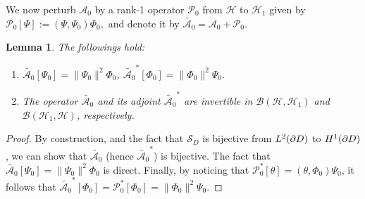 \documentclass[11pt]{article}
\numberwithin{equation}{section}
\newtheorem{lem}{Lemma}[section]
\def\cA{{\mathcal{A}}}
\newcommand\1{{\ensuremath {\mathds 1} }}
\begin{document}
We now perturb  $ \mathcal{A}_0 $ by a rank-1 operator $\mathcal{P}_0$ from $\mathcal{H}$ to $\mathcal{H}_1$
given by 
$
\mathcal{P}_0[\Psi]:= (\Psi, \Psi_0)\Phi_0,
$
and denote it by
$
\tilde{\mathcal{A}_0}= \mathcal{A}_0 + \mathcal{P}_0
$.
\begin{lem} The followings hold:
\begin{enumerate}
\item[(i)] $\tilde{\mathcal{A}_0}[\Psi_0]= \| \Psi_0 \|^2 \Phi_0 $, $\tilde{\mathcal{A}_0}^*[\Phi_0] = \| \Phi_0 \|^2\Psi_0$. 

\item[(ii)] The operator $\tilde{\mathcal{A}_0}$ and its adjoint $\tilde{\mathcal{A}_0}^*$ are invertible in
$\mathcal{B}(\mathcal{H}, \mathcal{H}_1)$ and  $\mathcal{B}(\mathcal{H}_1, \mathcal{H})$, respectively. 

\end{enumerate}
\end{lem}

\begin{proof}
By construction, and the fact that $\mathcal{S}_D$ is bijective from $L^2(\partial D)$ to $H^1(\partial D)$ \cite{Ammari2007_polarizationBook}, we can show that $\tilde{\mathcal{A}_0}$ (hence $\tilde{\mathcal{A}_0}^*$) is bijective. The fact that $\tilde{\cA_0}[\Psi_0] =  \| \Psi_0 \|^2 \Phi_0$ is direct. Finally, by noticing that $\mathcal{P}_0^*[\theta]= (\theta, \Phi_0)\Psi_0$, it follows that 
$
\tilde{\mathcal{A}_0}^* [\Phi_0] = \mathcal{P}_0^*[\Phi_0] = \| \Phi_0 \|^2  \Psi_0.
$
\end{proof}
\end{document}
